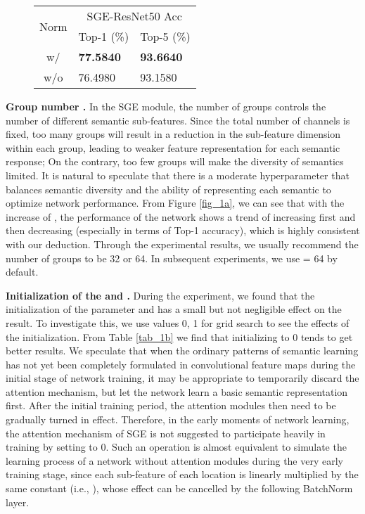 \documentclass{article}
\begin{document}
\begin{figure}
\begin{minipage}[b]{0.3\linewidth}
			\vspace{-7pt}
			\begin{tabular}{c|l|l}
				\hline
				\multirow{2}{*}{Norm} & \multicolumn{2}{c}{SGE-ResNet50 Acc}        \\ \cline{2-3} 
				& \multicolumn{1}{c|}{Top-1 (\%)} & Top-5 (\%) \\ \hline
				w/    &\bf 77.5840 &\bf     93.6640       \\ \hline
				w/o   & 76.4980 &     93.1580       \\ \hline \end{tabular}
			\vspace{+13pt}
			\label{tab_1c}
		\end{minipage}
		\vspace{-20pt}
\end{figure}
	
	
	
	\textbf{Group number .} In the SGE module, the number of groups  controls the number of different semantic sub-features. Since the total number of channels is fixed, too many groups will result in a reduction in the sub-feature dimension within each group, leading to weaker feature representation for each semantic response; On the contrary, too few groups will make  the diversity of semantics limited. It is natural to speculate that there is a moderate hyperparameter  that balances semantic diversity and the ability of representing each semantic to optimize network performance. From Figure \ref{fig_1a}, we can see that with the increase of , the performance of the network shows a trend of increasing first and then decreasing (especially in terms of Top-1 accuracy), which is highly consistent with our deduction. Through the experimental results, we usually recommend the number of groups  to be 32 or 64. In subsequent experiments, we use  = 64 by default.  
	
	\textbf{Initialization of the  and .} During the experiment, we found that the initialization of the parameter  and  has a small but not negligible effect on the result. To investigate this, we use values 0, 1 for grid search to see the effects of the initialization. From Table \ref{tab_1b} we find that initializing  to 0 tends to get better results. We speculate that when the ordinary patterns of semantic learning has not yet been completely formulated in convolutional feature maps during the initial stage of network training, it may be appropriate to temporarily discard the attention mechanism, but let the network learn a basic semantic representation first.  After the initial training period, the attention modules then need to be gradually turned in effect. Therefore, in the early moments of network learning, the attention mechanism of SGE is not suggested to participate heavily in training by setting  to 0. Such an operation is almost equivalent to simulate the learning process of a network without attention modules during the very early training stage, since each sub-feature of each location is linearly multiplied by the same constant (i.e., ), whose effect can be cancelled by the following BatchNorm layer. 
	
\end{document}
